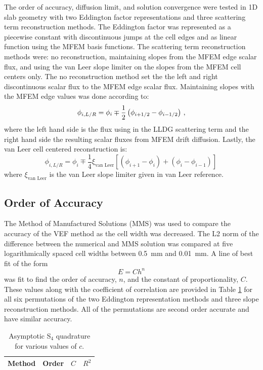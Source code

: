 
The order of accuracy, diffusion limit, and solution convergence were tested in 1D slab geometry with two Eddington factor representations and three scattering term reconstruction methods. The Eddington factor was represented as a piecewise constant with discontinuous jumps at the cell edges and as linear function using the MFEM basis functions. The scattering term reconstruction methods were: no reconstruction, maintaining slopes from the MFEM edge scalar flux, and using the van Leer slope limiter on the slopes from the MFEM cell centers only. The no reconstruction method set the the left and right discontinuous scalar flux to the MFEM edge scalar flux. Maintaining slopes with the MFEM edge values was done according to: 
	\begin{equation} \label{eq:edgeReconstruction}
		\phi_{i,L/R} = \phi_i \mp \frac{1}{2}\left(\phi_{i+1/2} - \phi_{i-1/2}\right) \,,
	\end{equation}
where the left hand side is the flux using in the LLDG scattering term and the right hand side the resulting scalar fluxes from MFEM drift diffusion. Lastly, the van Leer cell centered reconstruction is: 
	\begin{equation} \label{eq:vanLeer}
		\phi_{i,L/R} = \phi_i \mp \frac{1}{4} \xi_\text{van Leer} \left[ \left(\phi_{i+1} - \phi_{i}\right) + 
			\left(\phi_{i} - \phi_{i-1}\right)\right] \,
	\end{equation}
where $\xi_\text{van Leer}$ is the van Leer slope limiter given in van Leer reference.

\subsection{Order of Accuracy}
The Method of Manufactured Solutions (MMS) was used to compare the accuracy of the VEF method as the cell width was decreased. The L2 norm of the difference between the numerical and MMS solution was compared at five logarithmically spaced cell widths between \SI{0.5}{mm} and \SI{0.01}{mm}. A line of best fit of the form 
	\begin{equation} 
		E = C h^n 
	\end{equation}
was fit to find the order of accuracy, $n$, and the constant of proportionality, $C$. These values along with the coefficient of correlation are provided in Table \ref{tab:mms} for all six permutations of the two Eddington representation methods and three slope reconstruction methods. All of the permutations are second order accurate and have similar accuracy. 
	\begin{table}[!h] \centering
	\begin{tabular}{|c|c|c|c|}
	\hline
	\hline
	Method & Order & $C$ & $R^2$ \\ 
	\hline
		
	\hline
	\hline
	\end{tabular}
	\caption{Asymptotic S$_4$ quadrature for various values of $c$.}
	\label{tab:mms}
	\end{table}
	\afterpage{\clearpage}

